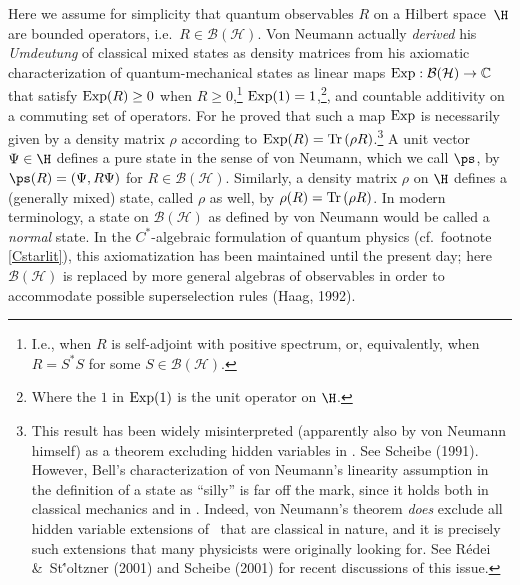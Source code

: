 \documentclass[12pt,titlepage]{article}
\newcommand{\ca}{$C^*$-algebra} \newcommand{\jba}{JB-algebra}
\newcommand{\Hs}{Hilbert space} \newcommand{\Bs}{Banach space}
\newcommand{\raw}{\rightarrow} \newcommand{\rat}{\mapsto}
\newcommand{\Tr}{\mbox{\rm Tr}\,} \newcommand{\Ad}{{\rm Ad}}
\newcommand{\BH}{\mathcal{B}({\mathcal H})} \newcommand{\diri}{\int^{\oplus}}
\newcommand{\Exp}{{\rm Exp}}
\newcommand{\rh}{\rho} \newcommand{\sg}{\sigma}
\renewcommand{\C}{{\mathbb C}} \newcommand{\D}{{\mathbb D}}
\begin{document}
Here we  assume for simplicity that 
 quantum observables $R$ on a \Hs\ $\H$ are bounded operators, i.e.\ $R\in\BH$. Von Neumann actually {\it derived} his {\it Umdeutung} of classical mixed states as density matrices from his axiomatic characterization of quantum-mechanical states as  linear maps $\Exp: \BH\raw \C$  that satisfy $\Exp(R)\geq 0$ when $R\geq 0$,\footnote{I.e., when $R$ is self-adjoint with positive spectrum, or, equivalently, when $R=S^*S$ for some $S\in \BH$.} $\Exp(1)=1$,\footnote{Where the $1$ in $\Exp(1)$ is the unit operator on $\H$.},  and countable additivity on a commuting set of operators. For he proved that such a map $\Exp$ is necessarily given by a density matrix $\rh$ according to $\Exp(R)=\Tr(\rh R)$.\footnote{This result has been widely misinterpreted (apparently also by von Neumann himself) as a theorem excluding hidden variables in \qm. See Scheibe (1991).  However, Bell's characterization of von Neumann's linearity assumption in the definition of a state as ``silly'' is far off the mark, since it holds  both in classical mechanics and in \qm.  Indeed, von Neumann's theorem {\it does} exclude all hidden variable extensions of \qm\ that are classical in nature, and it is precisely such extensions that many physicists were originally looking for. See R\'{e}dei \&\ St\''{o}ltzner (2001) and Scheibe (2001) 
for  recent discussions of this issue.} 
A unit vector $\Psi\in\H$ defines a pure state in the sense of von Neumann, which we call $\ps$, by $\ps(R)=(\Psi,R\Psi)$ for $R\in\BH$. Similarly, a density matrix $\rh$ on $\H$ defines a (generally mixed) state, called $\rh$ as well, by $\rh(R)=\Tr(\rh R)$.
In modern terminology, a state on $\BH$ as defined by von Neumann would be called a {\it normal} state.
 In the \ca ic formulation of quantum physics (cf.\ footnote  \ref{Cstarlit}), this axiomatization has been maintained until the present day; here $\BH$ is replaced by more general algebras of observables in order to accommodate possible superselection rules (Haag, 1992).  
\end{document}
